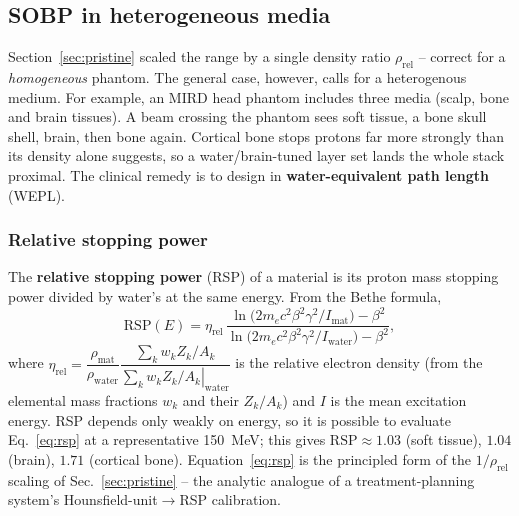 \documentclass[11pt]{article}
\begin{document}

\subsection{SOBP in heterogeneous media}
\label{sec:wepl}

Section~\ref{sec:pristine} scaled the range by a single density ratio
$\rho_{\mathrm{rel}}$ -- correct for a \emph{homogeneous} phantom. The general case, however, calls for a heterogenous medium. For example, an MIRD head phantom includes three media (scalp, bone and brain tissues). A beam crossing the phantom  sees soft tissue, a bone skull shell, brain, then bone again. Cortical bone stops protons far more
strongly than its density alone suggests, so a water/brain-tuned layer set lands
the whole stack proximal. The clinical remedy is to design in
\textbf{water-equivalent path length} (WEPL).

\subsubsection{Relative stopping power}
The \textbf{relative stopping power} (RSP) of a material is its proton mass
stopping power divided by water's at the same energy. From the Bethe formula,
\begin{equation}
\mathrm{RSP}(E)=\eta_{\mathrm{rel}}\,
\frac{\ln\!\big(2 m_e c^2\beta^2\gamma^2/I_{\mathrm{mat}}\big)-\beta^2}
{\ln\!\big(2 m_e c^2\beta^2\gamma^2/I_{\mathrm{water}}\big)-\beta^2},
\label{eq:rsp}
\end{equation}
where
$\eta_{\mathrm{rel}}=\dfrac{\rho_{\mathrm{mat}}}{\rho_{\mathrm{water}}}
\dfrac{\sum_k w_k Z_k/A_k}{\left.\sum_k w_k Z_k/A_k\right|_{\mathrm{water}}}$
is the relative electron density (from the elemental mass fractions $w_k$ and
their $Z_k/A_k$) and $I$ is the mean excitation energy. 
RSP depends
only weakly on energy, so it is possible to evaluate Eq.~\eqref{eq:rsp} at a representative
\SI{150}{MeV}; this gives $\mathrm{RSP}\approx1.03$ (soft tissue), $1.04$ (brain),
$1.71$ (cortical bone). Equation~\eqref{eq:rsp} is the principled form of the
$1/\rho_{\mathrm{rel}}$ scaling of Sec.~\ref{sec:pristine} -- the analytic analogue
of a treatment-planning system's Hounsfield-unit$\to$RSP calibration.
\end{document}
